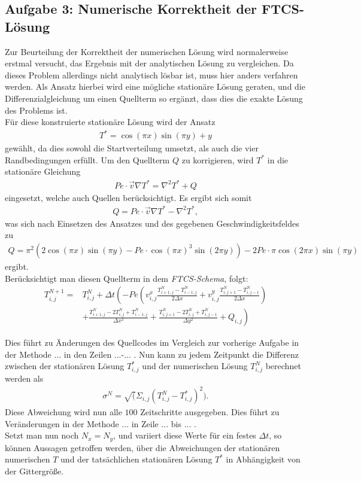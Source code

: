\documentclass[12pt,a4paper,titlepage,headinclude,bibtotoc]{scrartcl}
\begin{document}
\subsection{Aufgabe 3: Numerische Korrektheit der FTCS-Lösung}
\label{sec:task3}
Zur Beurteilung der Korrektheit der numerischen Lösung wird normalerweise erstmal versucht, das Ergebnis mit der analytischen Lösung zu vergleichen. Da dieses Problem allerdings nicht analytisch lösbar ist, muss hier anders verfahren werden. Als Ansatz hierbei wird eine mögliche stationäre Lösung geraten, und die Differenzialgleichung um einen Quellterm so ergänzt, dass dies die exakte Lösung des Problems ist.\\
Für diese konstruierte stationäre Lösung wird der Ansatz
\begin{align*}
T^* = \cos(\pi x) \sin(\pi y) + y
\end{align*} 
gewählt, da dies sowohl die Startverteilung umsetzt, als auch die vier Randbedingungen erfüllt.
Um den Quellterm $Q$ zu korrigieren, wird $T^*$ in die stationäre Gleichung
\begin{align*}
Pe \cdot \vec{v} \nabla T^* = \nabla^2 T^* + Q 
\end{align*}
eingesetzt, welche auch Quellen berücksichtigt. Es ergibt sich somit
\begin{align*}
Q = Pe \cdot \vec{v} \nabla T^* - \nabla^2 T^*,
\end{align*}
was sich nach Einsetzen des Ansatzes und des gegebenen Geschwindigkeitsfeldes zu
\begin{align*}
Q = \pi^2 \left(2 \cos(\pi x) \sin(\pi y) - Pe \cdot \cos(\pi x)^3 \sin(2 \pi y) \right) - 2 Pe \cdot \pi \cos(2 \pi x) \sin(\pi y)
\end{align*}
ergibt.\\
Berücksichtigt man diesen Quellterm in dem \textit{FTCS-Schema}, folgt:
\begin{align*}
T_{i,j}^{N+1} = &T_{i,j}^N + \Delta t \left( -Pe \left( v^x_{i,j} \frac{T_{i+1,j}^N-T_{i-1,j}^N}{2\Delta x}+v^y_{i,j} \frac{T_{i,j+1}^N-T_{i,j-1}^N}{2\Delta x} \right) \right. \nonumber \\ 
 & \left.+ \frac{ T_{i+1,j}^N - 2 T_{i,j}^N +  T_{i-1,j}^N }{\Delta x^2} 
+ \frac{ T_{i,j+1}^N - 2  T_{i,j}^N + T_{i,j-1}^N}{\Delta y^2} + Q_{i,j} \right) 
\end{align*}

Dies führt zu Änderungen des Quellcodes im Vergleich zur vorherige Aufgabe in der Methode ... in den Zeilen ...-... .
Nun kann zu jedem Zeitpunkt die Differenz zwischen der stationären Lösung $T_{i,j}^*$ und der numerischen Lösung $T_{i,j}^N$ berechnet werden als
\begin{align*}
\sigma^N = \sqrt(\Sigma_{i,j} (T_{i,j}^N - T_{i,j}^*)^2 ).
\end{align*}
Diese Abweichung wird nun alle $100$ Zeitschritte ausgegeben. Dies führt zu Veränderungen in der Methode ... in Zeile ... bis ... .\\
Setzt man nun noch $N_x = N_y$, und variiert diese Werte für ein festes $\Delta t$, so können Aussagen getroffen werden, über die Abweichungen der stationären numerischen $T$ und der tatsächlichen stationären Lösung $T^*$ in Abhängigkeit von der Gittergröße.
\end{document}
